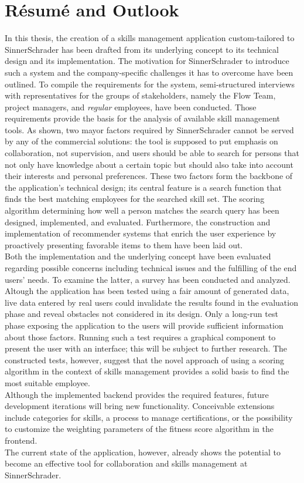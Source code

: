 \chapter{Résumé and Outlook}
In this thesis, the creation of a skills management application custom-tailored to SinnerSchrader has been drafted from its underlying concept to its technical design and its implementation. The motivation for SinnerSchrader to introduce such a system and the company-specific challenges it has to overcome have been outlined.
To compile the requirements for the system, semi-structured interviews with representatives for the groups of stakeholders, namely the Flow Team, project managers, and \textit{regular} employees, have been conducted. Those requirements provide the basis for the analysis of available skill management tools. As shown, two mayor factors required by SinnerSchrader cannot be served by any of the commercial solutions: the tool is supposed to put emphasis on collaboration, not supervision, and users should be able to search for persons that not only have knowledge about a certain topic but should also take into account their interests and personal preferences. These two factors form the backbone of the application's technical design; its central feature is a search function that finds the best matching employees for the searched skill set. The scoring algorithm determining how well a person matches the search query has been designed, implemented, and evaluated. Furthermore, the construction and implementation of recommender systems that enrich the user experience by proactively presenting favorable items to them have been laid out.\\
Both the implementation and the underlying concept have been evaluated regarding possible concerns including technical issues and the fulfilling of the end users' needs. To examine the latter, a survey has been conducted and analyzed.\\
Altough the application has been tested using a fair amount of generated data, live data entered by real users could invalidate the results found in the evaluation phase and reveal obstacles not considered in its design. Only a long-run test phase exposing the application to the users will provide sufficient information about those factors. Running such a test requires a graphical component to present the user with an interface; this will be subject to further research.
The constructed tests, however, suggest that the novel approach of using a scoring algorithm in the context of skills management provides a solid basis to find the
most suitable employee.\\
Although the implemented backend provides the required features, future development iterations will bring new functionality. Conceivable extensions include categories for skills, a process to manage certifications, or the possibility to customize the weighting parameters of the fitness score algorithm in the frontend.\\
The current state of the application, however, already shows the potential to become an effective tool for collaboration and skills management at SinnerSchrader.
